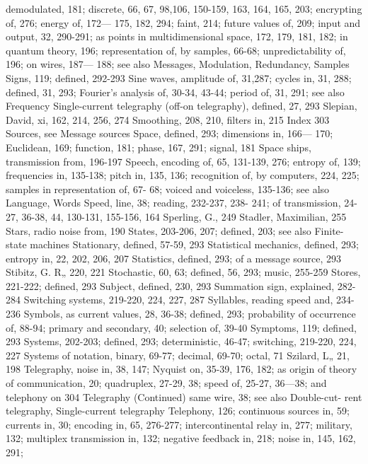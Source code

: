 {{{{{{{{{{{{{{{demodulated, 181; discrete, 66, 67,
98,106, 150-159, 163, 164, 165, 203;
encrypting of, 276; energy of, 172—
175, 182, 294; faint, 214; future
values of, 209; input and output, 32,
290-291; as points in multidimensional
space, 172, 179, 181, 182; in
quantum theory, 196; representation
of, by samples, 66-68; unpredictability
of, 196; on wires, 187—
188; see also Messages, Modulation,
Redundancy, Samples
Signs, 119; defined, 292-293
Sine waves, amplitude of, 31,287; cycles
in, 31, 288; defined, 31, 293;
Fourier’s analysis of, 30-34, 43-44;
period of, 31, 291; see also Frequency
Single-current telegraphy (off-on telegraphy),
defined, 27, 293
Slepian, David, xi, 162, 214, 256, 274
Smoothing, 208, 210, filters in, 215
Index 303
Sources, see Message sources
Space, defined, 293; dimensions in, 166—
170; Euclidean, 169; function, 181;
phase, 167, 291; signal, 181
Space ships, transmission from, 196-197
Speech, encoding of, 65, 131-139, 276;
entropy of, 139; frequencies in,
135-138; pitch in, 135, 136; recognition
of, by computers, 224, 225;
samples in representation of, 67-
68; voiced and voiceless, 135-136;
see also Language, Words
Speed, line, 38; reading, 232-237, 238-
241; of transmission, 24-27, 36-38,
44, 130-131, 155-156, 164
Sperling, G., 249
Stadler, Maximilian, 255
Stars, radio noise from, 190
States, 203-206, 207; defined, 203; see
also Finite-state machines
Stationary, defined, 57-59, 293
Statistical mechanics, defined, 293;
entropy in, 22, 202, 206, 207
Statistics, defined, 293; of a message
source, 293
Stibitz, G. R„ 220, 221
Stochastic, 60, 63; defined, 56, 293;
music, 255-259
Stores, 221-222; defined, 293
Subject, defined, 230, 293
Summation sign, explained, 282-284
Switching systems, 219-220, 224, 227,
287
Syllables, reading speed and, 234-236
Symbols, as current values, 28, 36-38;
defined, 293; probability of occurrence
of, 88-94; primary and secondary,
40; selection of, 39-40
Symptoms, 119; defined, 293
Systems, 202-203; defined, 293; deterministic,
46-47; switching, 219-220,
224, 227
Systems of notation, binary, 69-77;
decimal, 69-70; octal, 71
Szilard, L„ 21, 198
Telegraphy, noise in, 38, 147; Nyquist
on, 35-39, 176, 182; as origin of
theory of communication, 20;
quadruplex, 27-29, 38; speed of,
25-27, 36—38; and telephony on
304
Telegraphy (Continued)
same wire, 38; see also Double-cut-
rent telegraphy, Single-current
telegraphy
Telephony, 126; continuous sources in,
59; currents in, 30; encoding in, 65,
276-277; intercontinental relay in,
277; military, 132; multiplex transmission
in, 132; negative feedback
in, 218; noise in, 145, 162, 291;
}}}}}}}}}}}}}}}
